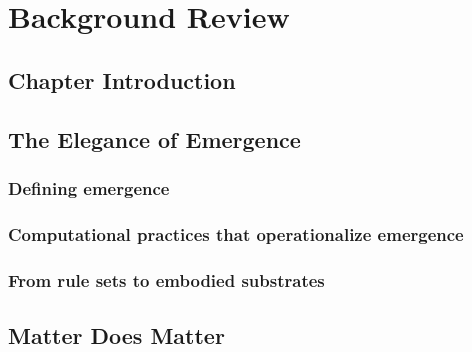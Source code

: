 
\chapter{Background Review}

\section*{Chapter Introduction}

\section{The Elegance of Emergence}

    \subsection{Defining emergence}

    \subsection{Computational practices that operationalize emergence}

    \subsection{From rule sets to embodied substrates}

\section{Matter Does Matter}

